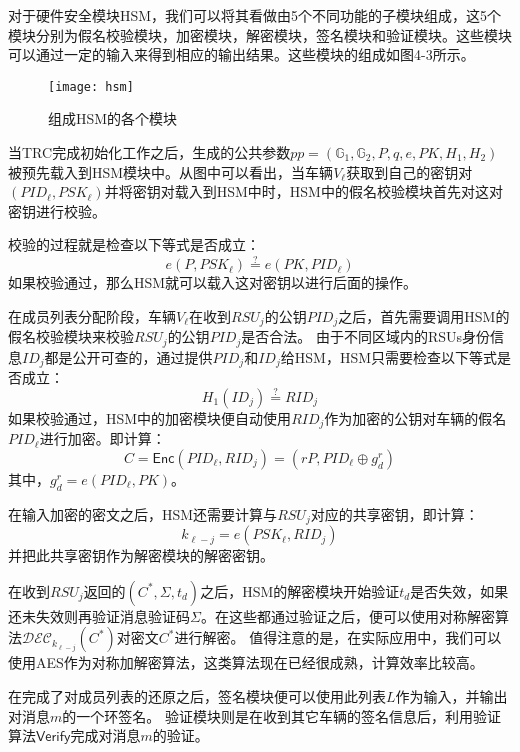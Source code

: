 对于硬件安全模块HSM，我们可以将其看做由5个不同功能的子模块组成，这5个模块分别为假名校验模块，加密模块，解密模块，签名模块和验证模块。这些模块可以通过一定的输入来得到相应的输出结果。这些模块的组成如图4-3所示。

\begin{figure}[h]
\centering
\texttt{[image: hsm]}
\caption{组成HSM的各个模块}
\end{figure}

当TRC完成初始化工作之后，生成的公共参数$pp=(\mathbb{G}_1,\mathbb{G}_2,P,q,e,PK,H_1,H_2)$被预先载入到HSM模块中。从图中可以看出，当车辆$V_\ell$获取到自己的密钥对$(PID_\ell,PSK_\ell)$并将密钥对载入到HSM中时，HSM中的假名校验模块首先对这对密钥进行校验。

校验的过程就是检查以下等式是否成立：
\begin{equation}
e(P,PSK_\ell)\overset{?}{=}e(PK,PID_\ell)
\end{equation}
如果校验通过，那么HSM就可以载入这对密钥以进行后面的操作。

在成员列表分配阶段，车辆$V_\ell$在收到$RSU_j$的公钥$PID_j$之后，首先需要调用HSM的假名校验模块来校验$RSU_j$的公钥$PID_j$是否合法。
由于不同区域内的RSUs身份信息$ID_j$都是公开可查的，通过提供$PID_j$和$ID_j$给HSM，HSM只需要检查以下等式是否成立：
\begin{equation}
H_1(ID_j)\overset{?}{=}RID_j
\end{equation}
如果校验通过，HSM中的加密模块便自动使用$RID_j$作为加密的公钥对车辆的假名$PID_\ell$进行加密。即计算：
\begin{equation}
C=\mathsf{Enc}(PID_\ell,RID_j)=(rP,PID_\ell\oplus g_d^r)
\end{equation}
其中，$g_d^r=e(PID_\ell,PK)$。

在输入加密的密文之后，HSM还需要计算与$RSU_j$对应的共享密钥，即计算：
\begin{equation}
k_{\ell-j}=e(PSK_\ell,RID_j)
\end{equation}
并把此共享密钥作为解密模块的解密密钥。

在收到$RSU_j$返回的$(C^*,\Sigma,t_d)$之后，HSM的解密模块开始验证$t_d$是否失效，如果还未失效则再验证消息验证码$\Sigma$。在这些都通过验证之后，便可以使用对称解密算法$\mathcal{DEC}_{k_{\ell-j}}(C^*)$对密文$C^*$进行解密。
值得注意的是，在实际应用中，我们可以使用AES作为对称加解密算法，这类算法现在已经很成熟，计算效率比较高。

在完成了对成员列表的还原之后，签名模块便可以使用此列表$L$作为输入，并输出对消息$m$的一个环签名。
验证模块则是在收到其它车辆的签名信息后，利用验证算法$\mathsf{Verify}$完成对消息$m$的验证。


